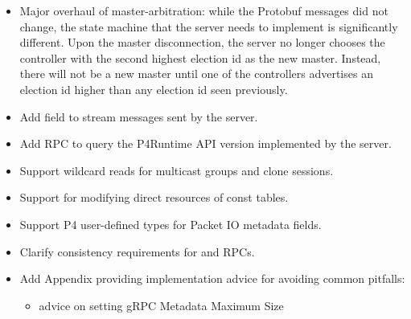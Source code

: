 \documentclass[11pt]{article}
\begin{document}
{%
\begin{itemize}[noitemsep,topsep=\mdcompacttopsep]%

\item{}Major overhaul of master-arbitration: while the Protobuf messages did not
change, the state machine that the server needs to implement is significantly
different. Upon the master disconnection, the server no longer chooses the
controller with the second highest election id as the new master. Instead,
there will not be a new master until one of the controllers advertises an
election id higher than any election id seen previously.%

\item{}Add  field to stream messages sent by the server.%

\item{}Add  RPC to query the P4Runtime API version implemented by the
server.%

\item{}Support wildcard reads for multicast groups and clone sessions.%

\item{}Support for modifying direct resources of const tables.%

\item{}Support P4 user-defined types for Packet IO metadata fields.%

\item{}Clarify consistency requirements for  and  RPCs.%

\item{}Add Appendix providing implementation advice for avoiding common pitfalls:

\begin{itemize}[noitemsep,topsep=\mdcompacttopsep]%

\item{}advice on setting gRPC Metadata Maximum Size%


\end{itemize}
\end{itemize}}
\end{document}
